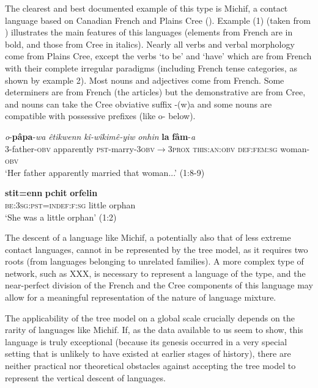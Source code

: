 \documentclass[svgnames,12pt]{scrartcl}
\newcommand{\ipa}[1]{{{\phon\mbox{#1}}}}
\begin{document}
{{The clearest and best documented example of this type is Michif, a contact language based on Canadian French and Plains Cree (\citealt{bakker97michif}). Example (1) (taken from \citealt{antonov15michif}) illustrates the main features of this languages (elements from French are in bold, and those from Cree in italics). Nearly all verbs and verbal morphology come from Plains Cree, except the verbs `to be' and `have' which are from French with their complete irregular paradigms (including French tense categories, as shown by example 2). Most nouns and adjectives come from French. Some determiners are from French (the articles) but the demonstrative are from Cree, and nouns can take the Cree obviative suffix \ipa{-(w)a} and some nouns are compatible with possessive prefixes (like \ipa{o-} below). 

\begin{exe}
\ex \gll \textit{o}-\textbf{pâpa}-\textit{wa} \textit{êtikwenn} \textit{kî-wîkimê-yiw} \textit{onhin} \textbf{la} \textbf{fâm}-\textit{a} \\
3-father-\textsc{obv} apparently \textsc{pst}-marry-\textsc{3obv$\rightarrow$3prox} \textsc{this:an:obv} 
\textsc{def:fem:sg} woman-\textsc{obv}\\
\glt ‘Her father apparently married that woman...’ (1:8-9)
\end{exe}

\begin{exe}
\ex \gll \textbf{stit=enn} \textbf{pchit} \textbf{orfelin} \\
\textsc{be:3sg:pst=indef:f:sg} little orphan \\
\glt ‘She was a little orphan’ (1:2)
\end{exe} 

The descent of a language like Michif, a potentially also that of less extreme contact languages, cannot in be represented by the tree model, as it requires two roots (from languages belonging to unrelated families). A more complex type of network, such as XXX, is necessary to represent a language of the type, and the near-perfect division of the French and the Cree components of this language may allow for a meaningful representation of the nature of language mixture.

The applicability of the tree model on a global scale crucially depends on the rarity of languages like Michif. If, as the data available to us seem to show, this language is truly exceptional (because its genesis occurred in a very special setting that is unlikely to have existed at earlier stages of history), there are neither practical nor theoretical obstacles against accepting the tree model to represent the vertical descent of languages.

}}
\end{document}
